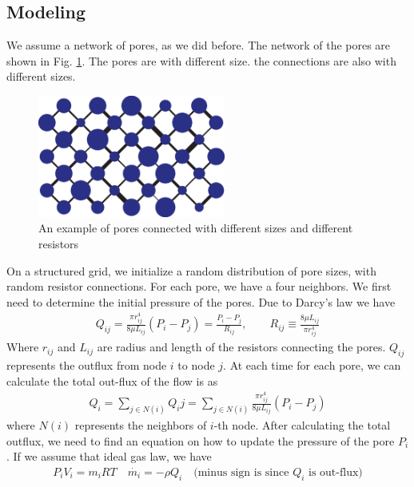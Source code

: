 \subsection{Modeling}
%
We assume a network of pores, as we did before. The network of the pores are shown in Fig. \ref{fig:relaxation-network}. The pores are with different size. the connections are also with different sizes. 
%
\begin{figure}[H]
  \centering
  \includegraphics[width=0.55\textwidth]{./Figs/relaxation_grid}
  \caption{An example of pores connected with different sizes and different resistors} \label{fig:relaxation-network}
\end{figure}
%
On a structured grid, we initialize a random distribution of pore sizes, with random resistor connections. For each pore, we have a four neighbors. We first  need to determine the initial pressure of the pores.  Due to Darcy's law we have
%
\begin{align}
    Q_{ij} = \frac{\pi r_{ij}^4}{8 \mu L_{ij}} \left( {P_i - P_j}\right) = \frac{P_i - P_j}{R_{ij}}, \qquad R_{ij} \equiv \frac{8 \mu L_{ij}}{\pi r_{ij}^4}
\end{align}
%
Where $r_{ij}$ and $L_{ij}$ are radius and length of the resistors connecting the pores. $Q_{ij}$ represents the outflux from node $i$ to node $j$. At each time for each pore, we can calculate the total out-flux of the flow is as 
%
\begin{align}
    Q_i = \sum_{j \in N(i)} Q_ij = \sum_{j \in N(i)} \frac{\pi r_{ij}^4}{8 \mu L_{ij}} \left( {P_i - P_j}\right)
\end{align}
%
where $N(i)$ represents the neighbors of $i$-th node. After calculating the total outflux, we need to find an equation on how to update the pressure of the pore $P_i$. If we assume that ideal gas law, we have
%
\begin{align}
    P_i V_i = m_i RT \quad \dot{m_i} = - \rho Q_i \quad \text{(minus sign is since } Q_i \text{ is out-flux)} 
    \end{align}
